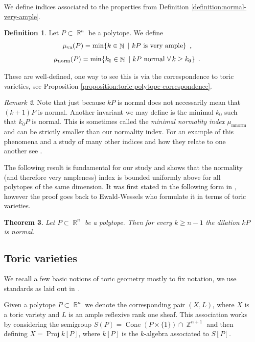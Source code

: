 \documentclass[a4paper,11pt]{amsart}
\theoremstyle{plain}
\newtheorem{theorem}{Theorem}[section]
\theoremstyle{definition}
\newtheorem{definition}[theorem]{Definition}
\theoremstyle{remark}
\newtheorem{remark}[theorem]{Remark}
\DeclareMathOperator{\NN}{\mathbb{N}}
\DeclareMathOperator{\ZZ}{\mathbb{Z}}
\DeclareMathOperator{\RR}{\mathbb{R}}
\DeclareMathOperator{\Cone}{Cone}
\DeclareMathOperator{\mnorm}{mnorm}
\DeclareMathOperator{\munorm}{\mu_{\text norm}}
\DeclareMathOperator{\muva}{\mu_{\text va}}
\DeclareMathOperator{\Proj}{Proj}
\begin{document}
We define indices associated to the properties from Definition \ref{definition:normal-very-ample}.

\begin{definition}
    Let $P \subset \RR^n$ be a polytope.
    We define
    \[\muva(P) = \min \{k \in \NN \,\, | \,\, kP \text{ is very ample}\} \enspace ,\]
    \[\munorm(P) = \min \{k_0 \in \NN\,\, | \,\, kP \text{  normal } \forall \, k\geq k_0\} \enspace .\]
\end{definition}
These are well-defined, one way to see this is via the correspondence to toric varieties, see Proposition \ref{proposition:toric-polytope-correspondence}.

\begin{remark}
    Note that just because $kP$ is normal does not necessarily mean that $(k+1)P$ is normal.
    Another invariant we may define is the minimal $k_0$ such that $k_0P$ is normal. This is sometimes called the \emph{minimal normality index} $\mu_{\mnorm}$ and can be strictly smaller than our normality index.
    For an example of this phenomena and a study of many other indices and how they relate to one another see \cite{CoxHasseHibiHigashitani:2014}.
\end{remark}

The following result is fundamental for our study and shows that the normality (and therefore very ampleness) index is bounded uniformly above for all polytopes of the same dimension.
It was first stated in the following form in \cite{BrunsGubeladzeTrung:1997}, however the proof goes back to Ewald-Wessels \cite{EwaldWessels:1991} who formulate it in terms of toric varieties.

\begin{theorem}\label{theorem:EW}
    Let $P \subset \RR^n$ be a polytope. Then for every $k\geq n-1$ the dilation $kP$ is normal.
\end{theorem}

\subsection{Toric varieties} \hfill

We recall a few basic notions of toric geometry mostly to fix notation, we use standards as laid out in \cite{CoxLittleSchenck:2011}.

Given a polytope $P \subset \RR^n$ we denote the corresponding pair $(X,L)$, where $X$ is a toric variety and $L$ is an ample reflexive rank one sheaf.
This association works by considering the semigroup $S(P)=\Cone(P \times\{1\}) \cap \ZZ^{n+1}$ and then defining $X = \Proj k[P]$, where $k[P]$ is the $k$-algebra associated to $S[P]$.
\end{document}
